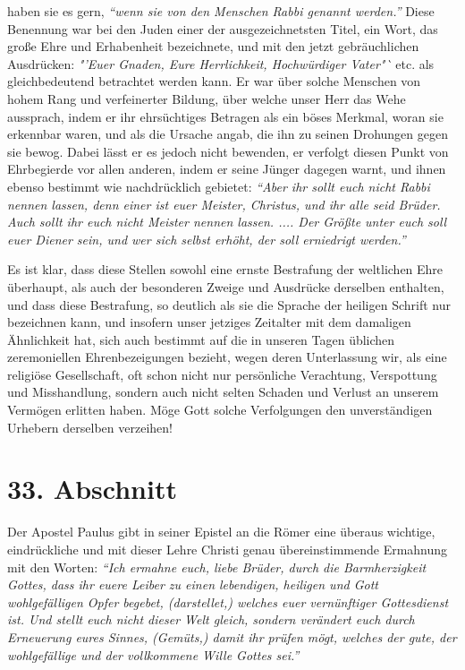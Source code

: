 haben sie es gern,
\textit{"`wenn sie von den Menschen Rabbi genannt
werden."'}
Diese Benennung war bei den Juden einer der
ausgezeichnetsten Titel, ein Wort, das große Ehre und Erhabenheit bezeichnete,
und mit den jetzt gebräuchlichen Ausdrücken: \textit{"'Euer Gnaden, Eure
Herrlichkeit, Hochwürdiger Vater"`} etc. als gleichbedeutend betrachtet werden
kann. Er war
über solche Menschen von hohem Rang und verfeinerter Bildung, über welche unser
Herr das Wehe aussprach, indem er ihr ehrsüchtiges Betragen als ein böses
Merkmal, woran sie erkennbar waren, und als die Ursache angab, die ihn zu seinen
Drohungen gegen sie bewog. Dabei lässt er es jedoch nicht bewenden, er verfolgt
diesen Punkt von Ehrbegierde vor allen anderen, indem er seine Jünger dagegen
warnt, und ihnen ebenso bestimmt wie nachdrücklich gebietet:
\textit{"`Aber ihr sollt
euch nicht Rabbi nennen lassen, denn einer ist euer Meister, Christus, und ihr
alle seid Brüder. Auch sollt ihr euch nicht Meister nennen lassen. .... Der
Größte unter euch soll euer Diener sein, und wer sich selbst erhöht, der soll
erniedrigt werden."'}

\medskip

Es ist klar, dass diese Stellen sowohl eine ernste Bestrafung der weltlichen
Ehre
überhaupt, als auch der besonderen Zweige und Ausdrücke derselben enthalten, und
dass diese Bestrafung, so deutlich als sie die Sprache der heiligen Schrift nur
bezeichnen kann, und insofern unser jetziges Zeitalter mit dem damaligen
Ähnlichkeit hat, sich auch bestimmt auf die in unseren Tagen üblichen
zeremoniellen Ehrenbezeigungen bezieht, wegen deren Unterlassung wir, als eine
religiöse Gesellschaft, oft schon nicht nur persönliche Verachtung, Verspottung
und Misshandlung, sondern auch nicht selten Schaden und Verlust an unserem
Vermögen erlitten haben. Möge Gott solche Verfolgungen den unverständigen
Urhebern derselben verzeihen!

\section{33. Abschnitt} \label{kap9_ab33}

Der Apostel Paulus gibt in seiner Epistel an die Römer eine überaus wichtige,
eindrückliche und mit dieser Lehre Christi genau übereinstimmende Ermahnung mit
den Worten:
\textit{"`Ich ermahne euch, liebe Brüder, durch die Barmherzigkeit Gottes,
dass ihr euere Leiber zu einen lebendigen, heiligen und Gott wohlgefälligen
Opfer
begebet, (darstellet,) welches euer vernünftiger Gottesdienst ist. Und stellt
euch nicht dieser Welt gleich, sondern verändert euch durch Erneuerung eures
Sinnes, (Gemüts,) damit ihr prüfen mögt, welches der gute, der wohlgefällige
und der vollkommene Wille Gottes sei."'}

